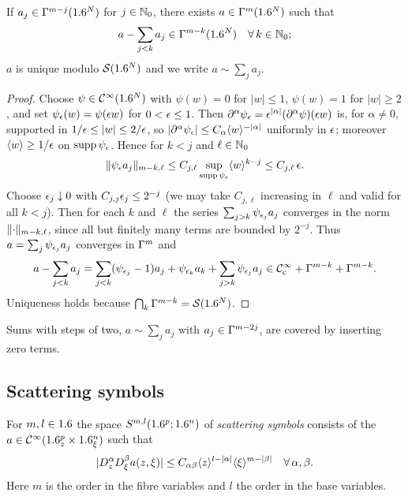 \begin{lemma}\label{isotropic:lem:asymp-Gamma}
If $a_j\in\Gamma^{m-j}(1.6^N)$ for $j\in\mathbb{N}_0$, there exists $a\in\Gamma^{m}(1.6^N)$ such that
\begin{equation*}
  a-\sum_{j<k}a_j\in\Gamma^{m-k}(1.6^N)\quad\forall\,k\in\mathbb{N}_0;
\end{equation*}
$a$ is unique modulo $\mathcal{S}(1.6^N)$ and we write $a\sim\sum_ja_j$.
\end{lemma}
\begin{proof}
Choose $\psi\in\mathcal{C}^\infty(1.6^N)$ with $\psi(w)=0$ for $|w|\le1$, $\psi(w)=1$ for
$|w|\ge2$, and set $\psi_\epsilon(w)=\psi(\epsilon w)$ for $0<\epsilon\le1$. Then
$\partial^\alpha\psi_\epsilon=\epsilon^{|\alpha|}(\partial^\alpha\psi)(\epsilon w)$ is, for
$\alpha\ne0$, supported in $1/\epsilon\le|w|\le2/\epsilon$, so
$|\partial^\alpha\psi_\epsilon|\le C_\alpha\langle w\rangle^{-|\alpha|}$ uniformly in $\epsilon$;
moreover $\langle w\rangle\ge1/\epsilon$ on $\operatorname{supp}\psi_\epsilon$. Hence for $k<j$ and
$\ell\in\mathbb{N}_0$
\begin{equation*}
  \lVert \psi_\epsilon a_j\rVert_{m-k,\ell}\le C_{j,\ell}\sup_{\operatorname{supp}\psi_\epsilon}\langle w\rangle^{k-j}\le C_{j,\ell}\,\epsilon .
\end{equation*}
Choose $\epsilon_j\downarrow0$ with $C_{j,j}\epsilon_j\le 2^{-j}$ (we may take
$C_{j,\ell}$ increasing in $\ell$ and valid for all $k<j$). Then for each $k$
and $\ell$ the series $\sum_{j>k}\psi_{\epsilon_j}a_j$ converges in the norm
$\lVert \cdot\rVert_{m-k,\ell}$, since all but finitely many terms are bounded by
$2^{-j}$. Thus $a=\sum_j\psi_{\epsilon_j}a_j$ converges in $\Gamma^{m}$ and
\begin{equation*}
  a-\sum_{j<k}a_j=\sum_{j<k}(\psi_{\epsilon_j}-1)a_j+\psi_{\epsilon_k}a_k+\sum_{j>k}\psi_{\epsilon_j}a_j
  \in\mathcal{C}^\infty_{\mathrm{c}}+\Gamma^{m-k}+\Gamma^{m-k}.
\end{equation*}
Uniqueness holds because $\bigcap_k\Gamma^{m-k}=\mathcal{S}(1.6^N)$.
\end{proof}
Sums with steps of two, $a\sim\sum_ja_j$ with $a_j\in\Gamma^{m-2j}$, are covered
by inserting zero terms.

\subsection{Scattering symbols}

\begin{definition}\label{isotropic:def:Ssc}
For $m,l\in1.6$ the space $S^{m,l}(1.6^p;1.6^n)$ of \emph{scattering symbols}
consists of the $a\in\mathcal{C}^\infty(1.6^p_z\times1.6^n_\xi)$ such that
\begin{equation*}
  |D_z^\alpha D_\xi^\beta a(z,\xi)|\le C_{\alpha\beta}\langle z\rangle^{l-|\alpha|}\langle \xi\rangle^{m-|\beta|}\quad\forall\,\alpha,\beta.
\end{equation*}
Here $m$ is the order in the fibre variables and $l$ the order in the base
variables.
\end{definition}

